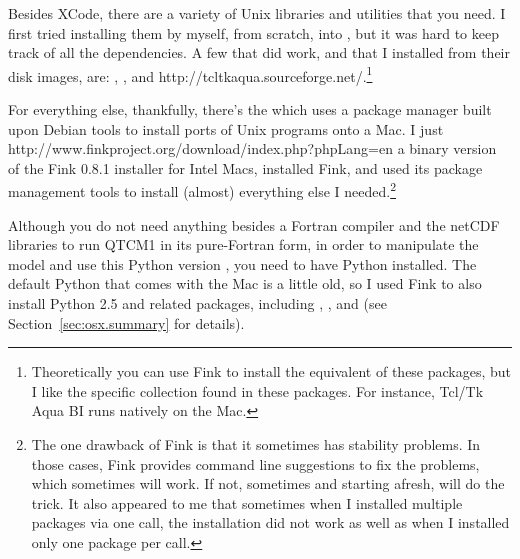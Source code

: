 Besides XCode, there are a variety of Unix libraries and utilities that you
need.  I first tried installing them by myself, from scratch, into
, but it was hard to keep track of all the dependencies.
A few that did work, and that I installed from their disk images, are:
, 
, and 
%
	{http://tcltkaqua.sourceforge.net/}.\footnote%
		{Theoretically you can use Fink to install the equivalent
		of these packages, but I like the specific collection 
		found in these packages.  For instance, Tcl/Tk Aqua BI
		runs natively on the Mac.}

For everything else, thankfully, there's the
 which
uses a package manager built upon Debian tools to install ports of
Unix programs onto a Mac.  I just 
%
	{http://www.finkproject.org/download/index.php?phpLang=en}
a binary version of the Fink 0.8.1 installer for Intel Macs,
installed Fink, and used its package management tools to install
(almost) everything else I needed.\footnote%
	{The one drawback of Fink is that it sometimes
	has stability problems.  In those cases, Fink provides
	command line suggestions to fix the problems, which sometimes
	will work.  If not, sometimes
	and starting afresh, will do the trick.
	It also appeared to me that sometimes when I installed 
	multiple packages
	via one  call, the installation did not work
	as well as when I installed only one package per call.}

Although you do not need anything besides a Fortran compiler and
the netCDF libraries to run QTCM1 in its pure-Fortran form, in order to
manipulate the model and use this Python version , you
need to have Python installed.  The default Python that comes
with the Mac is a little old, so I used Fink to also install
Python 2.5 and related packages, including
,
,
and
(see Section~\ref{sec:osx.summary} for details).




